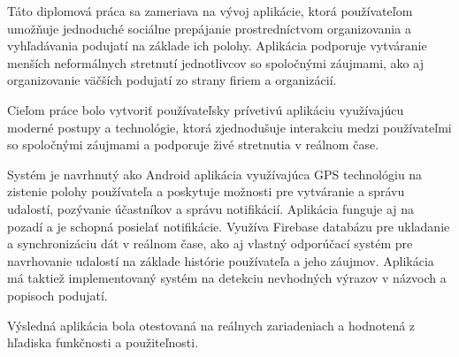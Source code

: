 Táto diplomová práca sa zameriava na vývoj aplikácie, ktorá používateľom 
umožňuje jednoduché sociálne prepájanie prostredníctvom organizovania 
a vyhľadávania podujatí na základe ich polohy. 
Aplikácia podporuje vytváranie menších neformálnych stretnutí 
jednotlivcov so spoločnými záujmami, ako aj organizovanie väčších 
podujatí zo strany firiem a organizácií.


Cieľom práce bolo vytvoriť používateľsky prívetivú aplikáciu využívajúcu moderné 
postupy a technológie, ktorá zjednodušuje interakciu medzi používateľmi 
so spoločnými záujmami a podporuje živé stretnutia v reálnom čase.

Systém je navrhnutý ako Android aplikácia využívajúca GPS technológiu na zistenie 
polohy používateľa a poskytuje možnosti pre vytváranie a správu udalostí, 
pozývanie účastníkov a správu notifikácií.
Aplikácia funguje aj na pozadí a je schopná posielať notifikácie. 
Využíva Firebase databázu pre ukladanie a synchronizáciu dát v reálnom čase, 
ako aj vlastný odporúčací systém pre navrhovanie udalostí na základe histórie 
používateľa a jeho záujmov.
Aplikácia má taktiež implementovaný systém na detekciu nevhodných výrazov 
v názvoch a popisoch podujatí.

Výsledná aplikácia bola otestovaná na reálnych zariadeniach a hodnotená 
z hľadiska funkčnosti a použiteľnosti.
